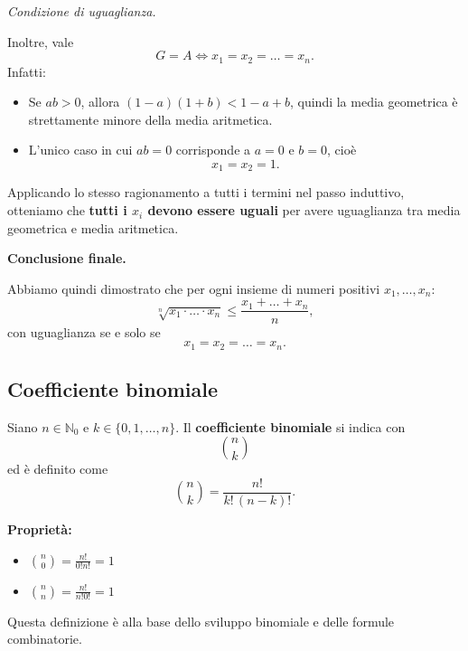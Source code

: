 {\textit{Condizione di uguaglianza.}

Inoltre, vale
$$
G = A \iff x_1 = x_2 = \dots = x_n.
$$
Infatti:
\begin{itemize}
\item Se $ab > 0$, allora $(1-a)(1+b) < 1-a+b$, quindi la media geometrica è strettamente minore della media aritmetica.
\item L'unico caso in cui $ab = 0$ corrisponde a $a = 0$ e $b = 0$, cioè
$$
x_1 = x_2 = 1.
$$
\end{itemize}

Applicando lo stesso ragionamento a tutti i termini nel passo induttivo, otteniamo che \textbf{tutti i $x_i$ devono essere uguali} per avere uguaglianza tra media geometrica e media aritmetica.

\textbf{Conclusione finale.}

Abbiamo quindi dimostrato che per ogni insieme di numeri positivi $x_1, \dots, x_n$:
$$
\sqrt[n]{x_1 \cdot \dots \cdot x_n} \leq \frac{x_1 + \dots + x_n}{n},
$$
con uguaglianza se e solo se
$$
x_1 = x_2 = \dots = x_n.
$$
}

\subsection{Coefficiente binomiale}
Siano $n \in \mathbb{N}_{0}$ e $k \in \{0, 1, \dots, n\}$. Il \textbf{coefficiente binomiale} si indica con
$$
\binom{n}{k}
$$
ed è definito come
$$
\binom{n}{k} = \frac{n!}{k! \, (n-k)!}.
$$

\textbf{Proprietà:}
\begin{itemize}
\item $\displaystyle \binom{n}{0} = \frac{n!}{0!n!}=1$
\item $\displaystyle \binom{n}{n} = \frac{n!}{n!0!}= 1$
\end{itemize}

Questa definizione è alla base dello sviluppo binomiale e delle formule combinatorie.

